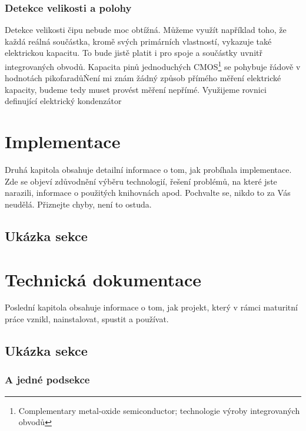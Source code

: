 \documentclass[11pt,a4paper,twoside,openright]{report}
\begin{document}
\subsection {Detekce velikosti a polohy}

Detekce velikosti čipu nebude moc obtížná. Můžeme využít například toho, že každá reálná součástka, kromě svých primárních vlastností, vykazuje také elektrickou kapacitu. To bude jistě platit i pro spoje a součástky uvnitř integrovaných obvodů. Kapacita pinů jednoduchých CMOS\footnote{Complementary metal-oxide semiconductor; technologie výroby integrovaných obvodů} se pohybuje řádově v hodnotách pikofaradů\. Není mi znám žádný způsob přímého měření elektrické kapacity, budeme tedy muset provést měření nepřímé. Využijeme rovnici definující elektrický kondenzátor







\chapter{Implementace}

Druhá kapitola obsahuje detailní informace o tom, jak probíhala implementace. Zde se objeví zdůvodnění výběru technologií, řešení problémů, na které jste narazili, informace o použitých knihovnách apod. Pochvalte se, nikdo to za Vás neudělá. Přiznejte chyby, není to ostuda.

\section{Ukázka sekce}

\lipsum

\chapter{Technická dokumentace}

Poslední kapitola obsahuje informace o tom, jak projekt, který v rámci maturitní práce vznikl, nainstalovat, spustit a používat.

\section{Ukázka sekce}

\lipsum[5]

\subsection{A jedné podsekce}
\end{document}

